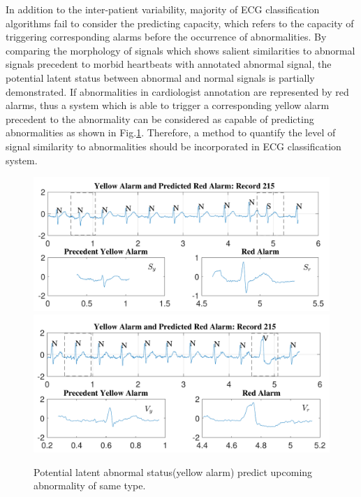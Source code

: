 In addition to the inter-patient variability, majority of ECG classification algorithms fail to consider the predicting capacity, which refers to the capacity of triggering corresponding alarms before the occurrence of abnormalities. By comparing the morphology of signals which shows salient similarities to abnormal signals precedent to morbid heartbeats with annotated abnormal signal, the potential latent status between abnormal and normal signals is partially demonstrated. If abnormalities in cardiologist annotation are represented by red alarms, thus a system which is able to trigger a corresponding yellow alarm precedent to the abnormality can be considered as capable of predicting abnormalities as shown in Fig.\ref{fig:pred_signals}. Therefore, a method to quantify the level of signal similarity to abnormalities should be incorporated in ECG classification system.

 \begin{figure}[t]
 	\centering
 	\includegraphics[scale=0.6]{Fig/predicting_record215S_croped.pdf}
 	\includegraphics[scale=0.6]{Fig/predicting_record215_croped.pdf} 
 	\caption{Potential latent abnormal status(yellow alarm) predict upcoming abnormality of same type.}
 	\label{fig:pred_signals}
 \end{figure}




